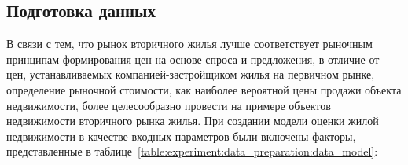 \subsection{Подготовка данных}
\label{sec:experiment:data_preparation}

В связи с тем, что рынок вторичного жилья лучше соответствует рыночным принципам формирования цен на основе спроса и
предложения, в отличие от цен, устанавливаемых компанией-застройщиком жилья на первичном рынке, определение рыночной
стоимости, как наиболее вероятной цены продажи объекта недвижимости, более целесообразно провести на примере объектов
недвижимости вторичного рынка жилья. При создании модели оценки жилой недвижимости в качестве входных параметров были
включены факторы, представленные в таблице~\ref{table:experiment:data_preparation:data_model}:

